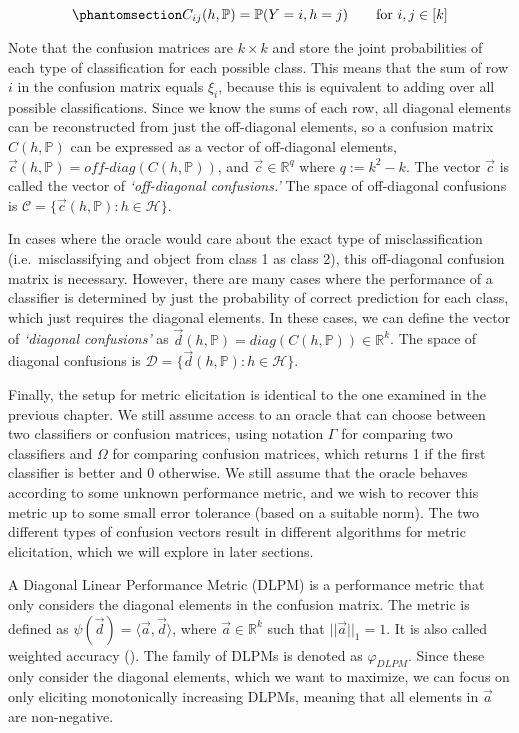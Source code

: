 \documentclass[
  letterpaper,
  numbers=noenddot,
  DIV=11]{scrreprt}
\theoremstyle{plain}
\theoremstyle{definition}
\theoremstyle{remark}
\begin{document}
\begin{equation}\phantomsection\label{eq-eq3.59}{C_{ij}(h, \mathbb{P}) = \mathbb{P}(Y=i, h=j) \text{\qquad for } i, j \in [k]}\end{equation}

Note that the confusion matrices are \(k\times k\) and store the joint
probabilities of each type of classification for each possible class.
This means that the sum of row \(i\) in the confusion matrix equals
\(\xi_i\), because this is equivalent to adding over all possible
classifications. Since we know the sums of each row, all diagonal
elements can be reconstructed from just the off-diagonal elements, so a
confusion matrix \(C(h, \mathbb{P})\) can be expressed as a vector of
off-diagonal elements,
\(\vec{c}(h, \mathbb{P}) = \textit{off-diag}(C(h, \mathbb{P}))\), and
\(\vec{c} \in \mathbb{R}^q\) where \(q := k^2 - k\). The vector
\(\vec{c}\) is called the vector of \emph{`off-diagonal confusions.'}
The space of off-diagonal confusions is
\(\mathcal{C} = \{\vec{c}(h, \mathbb{P}) : h \in \mathcal{H}\}\).

In cases where the oracle would care about the exact type of
misclassification (i.e.~misclassifying and object from class 1 as class
2), this off-diagonal confusion matrix is necessary. However, there are
many cases where the performance of a classifier is determined by just
the probability of correct prediction for each class, which just
requires the diagonal elements. In these cases, we can define the vector
of \emph{`diagonal confusions'} as
\(\vec{d}(h, \mathbb{P}) = \textit{diag}(C(h, \mathbb{P})) \in \mathbb{R}^k\).
The space of diagonal confusions is
\(\mathcal{D} = \{\vec{d}(h, \mathbb{P}) : h \in \mathcal{H}\}\).

Finally, the setup for metric elicitation is identical to the one
examined in the previous chapter. We still assume access to an oracle
that can choose between two classifiers or confusion matrices, using
notation \(\Gamma\) for comparing two classifiers and \(\Omega\) for
comparing confusion matrices, which returns 1 if the first classifier is
better and 0 otherwise. We still assume that the oracle behaves
according to some unknown performance metric, and we wish to recover
this metric up to some small error tolerance (based on a suitable norm).
The two different types of confusion vectors result in different
algorithms for metric elicitation, which we will explore in later
sections.

A Diagonal Linear Performance Metric (DLPM) is a performance metric that
only considers the diagonal elements in the confusion matrix. The metric
is defined as \(\psi(\vec{d}) = \langle \vec{a}, \vec{d} \rangle\),
where \(\vec{a} \in \mathbb{R}^k\) such that \(||\vec{a}||_1 = 1\). It
is also called weighted accuracy
(). The
family of DLPMs is denoted as \(\varphi_{DLPM}\). Since these only
consider the diagonal elements, which we want to maximize, we can focus
on only eliciting monotonically increasing DLPMs, meaning that all
elements in \(\vec{a}\) are non-negative.
\end{document}
